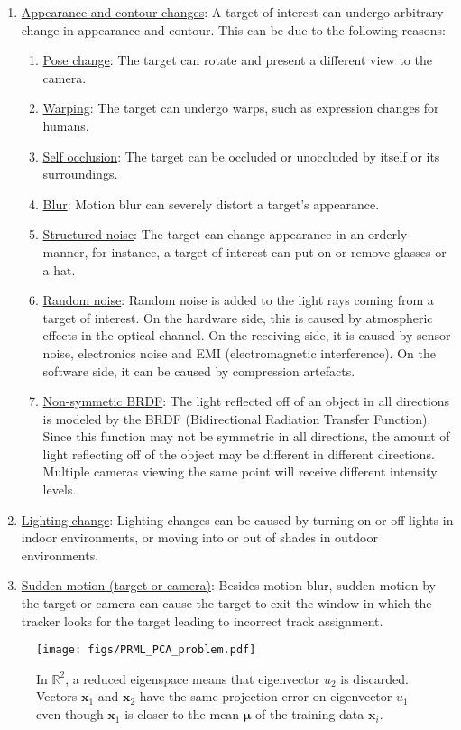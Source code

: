 \begin{enumerate}
\item \underline{Appearance and contour changes}:  A target of interest can undergo arbitrary change in appearance and contour.  This can be due to the following reasons:
\begin{enumerate}
\item \underline{Pose change}:  The target can rotate and present a different view to the camera.
\item \underline{Warping}: The target can undergo warps, such as expression changes for humans.
\item \underline{Self occlusion}:  The target can be occluded or unoccluded by itself or its surroundings.
\item \underline{Blur}:  Motion blur can severely distort a target's appearance.
\item \underline{Structured noise}:  The target can change appearance in an orderly manner, for instance, a target of interest can put on or remove glasses or a hat.
\item \underline{Random noise}:  Random noise is added to the light rays coming from a target of interest.  On the hardware side, this is caused by atmospheric effects in the optical channel.  On the receiving side, it is caused by sensor noise, electronics noise and EMI (electromagnetic interference).  On the software side, it can be caused by compression artefacts.
\item \underline{Non-symmetic BRDF}:  The light reflected off of an object in all directions is modeled by the BRDF (Bidirectional Radiation Transfer Function).  Since this function may not be symmetric in all directions, the amount of light reflecting off of the object may be different in different directions.  Multiple cameras viewing the same point will receive different intensity levels.
\end{enumerate}
\item \underline{Lighting change}: Lighting changes can be caused by turning on or off lights in indoor environments, or moving into or out of shades in outdoor environments.
\item \underline{Sudden motion (target or camera)}:  Besides motion blur, sudden motion by the target or camera can cause the target to exit the window in which the tracker looks for the target leading to incorrect track assignment.
\end{enumerate}

								\begin{figure}
								\centering
								\texttt{[image: figs/PRML\_PCA\_problem.pdf]}
								\caption{In $\mathbb{R}^2$, a reduced eigenspace means that eigenvector $u_2$ is discarded.  Vectors $\mathbf{x}_1$ and $\mathbf{x}_2$ have the same projection error on eigenvector $u_1$ even though $\mathbf{x}_1$ is closer to the mean $\boldsymbol\mu$ of the training data $\mathbf{x}_i$.}
								\label{fig:PRML_PCA_problem}
								\end{figure}

